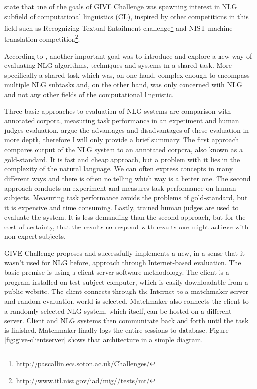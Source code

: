 \citet{koller2010first} state that one of the goals of GIVE Challenge was spawning interest in NLG subfield of computational linguistics (CL), inspired by other competitions in this field such as Recognizing Textual Entailment challenge\footnote{\url{http://pascallin.ecs.soton.ac.uk/Challenges/}} and NIST machine
translation competition\footnote{\url{http://www.itl.nist.gov/iad/mig//tests/mt/}}.

According to \citet{koller2010first}, another important goal was to introduce and explore a new way of evaluating NLG algorithms, techniques and systems in a shared task. More specifically a shared task which was, on one hand, complex enough to encompass multiple NLG subtasks and, on the other hand, was only concerned with NLG and not any other fields of the computational linguistic.

Three basic approaches to evaluation of NLG systems are comparison with annotated corpora, measuring task performance in an experiment and human judges evaluation. \citet{koller2010first} argue the advantages and disadvantages of these evaluation in more depth, therefore I will only provide a brief summary. The first approach compares output of the NLG system to an annotated corpora, also known as a gold-standard. It is fast and cheap approach, but a problem with it lies in the complexity of the natural language. We can often express concepts in many different ways and there is often no telling which way is a better one. The second approach conducts an experiment and measures task performance on human subjects. Measuring task performance avoids the problems of gold-standard, but it is expensive and time consuming. Lastly, trained human judges are used to evaluate the system. It is less demanding than the second approach, but for the cost of certainty, that the results correspond with results one might achieve with non-expert subjects.

GIVE Challenge proposes and successfully implements a new, in a sense that it wasn't used for NLG before, approach through Internet-based evaluation. The basic premise is using a client-server software methodology. The client is a program installed on test subject computer, which is easily downloadable from a public website. The client connects through the Internet to a matchmaker server and random evaluation world is selected. Matchmaker also connects the client to a randomly selected NLG system, which itself, can be hosted on a different server. Client and NLG systems then communicate back and forth until the task is finished. Matchmaker finally logs the entire sessions to database. Figure \ref{fig:give-clientserver} shows that architecture in a simple diagram.

